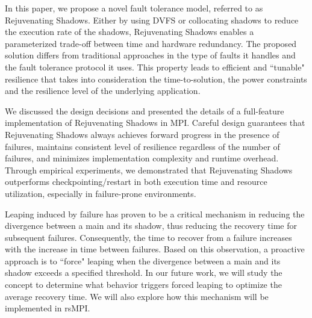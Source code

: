 
In this paper, we propose a novel fault tolerance model, referred to as Rejuvenating Shadows. %
Either by using DVFS or collocating shadows to reduce the execution rate of the shadows, 
Rejuvenating Shadows enables a parameterized trade-off between time and hardware redundancy. The proposed solution differs from traditional approaches in the type of faults it handles and the fault tolerance protocol it uses.  %
This property leads to efficient and ``tunable" resilience that takes into consideration the time-to-solution, the power constraints and the resilience level of the underlying application.%

We discussed the design decisions and presented the details of a full-feature implementation of Rejuvenating Shadows in MPI. Careful design guarantees that Rejuvenating Shadows always achieves forward progress in the presence of failures, maintains consistent level of resilience regardless of the number of failures, and minimizes implementation complexity and runtime overhead. Through empirical experiments, we demonstrated that Rejuvenating Shadows outperforms checkpointing/restart in both execution time and resource utilization, especially in failure-prone environments.

Leaping induced by failure has proven to be a critical mechanism in reducing the divergence between a main and its shadow, 
thus reducing the recovery time for subsequent failures. Consequently, the time to recover from a failure increases with the increase in time between failures.  
Based on this observation, a proactive approach is to ``force" leaping when the divergence between a main and its shadow exceeds a specified threshold. 
In our future work, we will study the concept to determine what behavior triggers forced leaping to optimize the average recovery time. We will also explore how this mechanism will be implemented in rsMPI.

